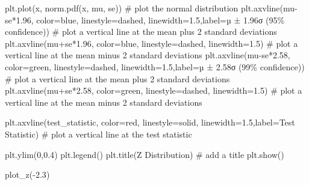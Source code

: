 \documentclass[
  letterpaper,
  DIV=11,
  numbers=noendperiod]{scrreprt}
\newenvironment{Shaded}{\begin{snugshade}}{\end{snugshade}}
\newcommand{\CommentTok}[1]{\textcolor[rgb]{0.37,0.37,0.37}{#1}}
\newcommand{\DecValTok}[1]{\textcolor[rgb]{0.68,0.00,0.00}{#1}}
\newcommand{\FloatTok}[1]{\textcolor[rgb]{0.68,0.00,0.00}{#1}}
\newcommand{\NormalTok}[1]{\textcolor[rgb]{0.00,0.23,0.31}{#1}}
\newcommand{\OperatorTok}[1]{\textcolor[rgb]{0.37,0.37,0.37}{#1}}
\newcommand{\SpecialCharTok}[1]{\textcolor[rgb]{0.37,0.37,0.37}{#1}}
\newcommand{\StringTok}[1]{\textcolor[rgb]{0.13,0.47,0.30}{#1}}
\begin{document}
\begin{Shaded}
\begin{Highlighting}[]
\NormalTok{    plt.plot(x, norm.pdf(x, mu, se)) }\CommentTok{\# plot the normal distribution}
\NormalTok{    plt.axvline(mu}\OperatorTok{{-}}\NormalTok{se}\OperatorTok{*}\FloatTok{1.96}\NormalTok{, color}\OperatorTok{=}\StringTok{\textquotesingle{}blue\textquotesingle{}}\NormalTok{, linestyle}\OperatorTok{=}\StringTok{\textquotesingle{}dashed\textquotesingle{}}\NormalTok{, linewidth}\OperatorTok{=}\FloatTok{1.5}\NormalTok{,label}\OperatorTok{=}\StringTok{\textquotesingle{}µ ± 1.96σ (95}\SpecialCharTok{\% c}\StringTok{onfidence)\textquotesingle{}}\NormalTok{) }\CommentTok{\# plot a vertical line at the mean plus 2 standard deviations}
\NormalTok{    plt.axvline(mu}\OperatorTok{+}\NormalTok{se}\OperatorTok{*}\FloatTok{1.96}\NormalTok{, color}\OperatorTok{=}\StringTok{\textquotesingle{}blue\textquotesingle{}}\NormalTok{, linestyle}\OperatorTok{=}\StringTok{\textquotesingle{}dashed\textquotesingle{}}\NormalTok{, linewidth}\OperatorTok{=}\FloatTok{1.5}\NormalTok{)  }\CommentTok{\# plot a vertical line at the mean minus 2 standard deviations}
\NormalTok{    plt.axvline(mu}\OperatorTok{{-}}\NormalTok{se}\OperatorTok{*}\FloatTok{2.58}\NormalTok{, color}\OperatorTok{=}\StringTok{\textquotesingle{}green\textquotesingle{}}\NormalTok{, linestyle}\OperatorTok{=}\StringTok{\textquotesingle{}dashed\textquotesingle{}}\NormalTok{, linewidth}\OperatorTok{=}\FloatTok{1.5}\NormalTok{,label}\OperatorTok{=}\StringTok{\textquotesingle{}µ ± 2.58σ (99}\SpecialCharTok{\% c}\StringTok{onfidence)\textquotesingle{}}\NormalTok{) }\CommentTok{\# plot a vertical line at the mean plus 2 standard deviations}
\NormalTok{    plt.axvline(mu}\OperatorTok{+}\NormalTok{se}\OperatorTok{*}\FloatTok{2.58}\NormalTok{, color}\OperatorTok{=}\StringTok{\textquotesingle{}green\textquotesingle{}}\NormalTok{, linestyle}\OperatorTok{=}\StringTok{\textquotesingle{}dashed\textquotesingle{}}\NormalTok{, linewidth}\OperatorTok{=}\FloatTok{1.5}\NormalTok{)  }\CommentTok{\# plot a vertical line at the mean minus 2 standard deviations}
    
\NormalTok{    plt.axvline(test\_statistic, color}\OperatorTok{=}\StringTok{\textquotesingle{}red\textquotesingle{}}\NormalTok{, linestyle}\OperatorTok{=}\StringTok{\textquotesingle{}solid\textquotesingle{}}\NormalTok{, linewidth}\OperatorTok{=}\FloatTok{1.5}\NormalTok{,label}\OperatorTok{=}\StringTok{\textquotesingle{}Test Statistic\textquotesingle{}}\NormalTok{) }\CommentTok{\# plot a vertical line at the test statistic}


\NormalTok{    plt.ylim(}\DecValTok{0}\NormalTok{,}\FloatTok{0.4}\NormalTok{)}
\NormalTok{    plt.legend()}
\NormalTok{    plt.title(}\StringTok{\textquotesingle{}Z Distribution\textquotesingle{}}\NormalTok{) }\CommentTok{\# add a title}
\NormalTok{    plt.show()}

\NormalTok{plot\_z(}\OperatorTok{{-}}\FloatTok{2.3}\NormalTok{)}
\end{Highlighting}
\end{Shaded}
\end{document}
